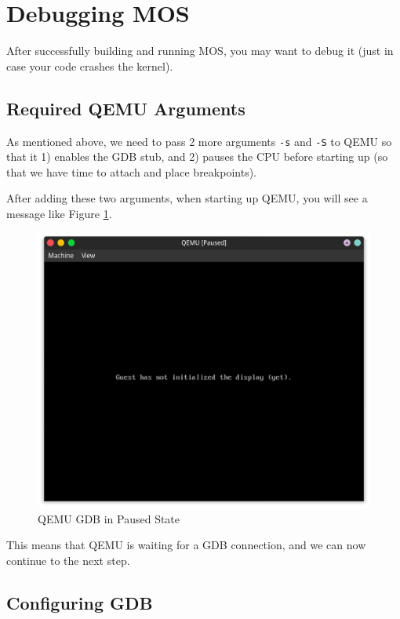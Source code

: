 \section{Debugging MOS}

After successfully building and running MOS, you may want to debug it (just in case your code crashes
the kernel).

\subsection{Required QEMU Arguments} \label{sec:qemu-args}

As mentioned above, we need to pass 2 more arguments \texttt{-s} and \texttt{-S} to QEMU so that it 1) enables the GDB stub, and
2) pauses the CPU before starting up (so that we have time to attach and place breakpoints).

After adding these two arguments, when starting up QEMU, you will see a message like Figure
\ref{fig:qemu-gdb-paused}.

\begin{figure}[h]
    \centering
    \includegraphics[width=\textwidth]{assets/c1.mos-qemu-gdb-paused.png}
    \caption{QEMU GDB in Paused State}
    \label{fig:qemu-gdb-paused}
\end{figure}

This means that QEMU is waiting for a GDB connection, and we can now continue to the next step.

\subsection{Configuring GDB} \label{sec:gdb-config}

